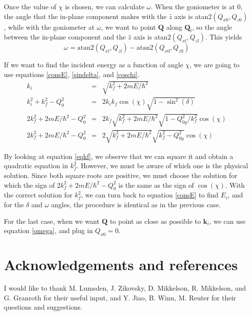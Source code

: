 \documentclass[prb]{revtex4}%
\begin{document}
Once the value of $\chi$ is chosen, we can calculate $\omega$. When the goniometer
is at 0, the angle that the in-plane component makes with the $\widehat{z}$ axis is
atan2$(Q_{x0},Q_{z0})$, while with the goniometer at $\omega$, we want to point $\textbf{Q}$ along
$\textbf{Q}_l$, so the angle between the in-plane component and the $\widehat{z}$ axis is
atan2$(Q_{xl},Q_{zl})$. This yields
\begin{equation}\label{omega}
    \omega = \text{atan2}(Q_{xl},Q_{zl}) - \text{atan2}(Q_{x0},Q_{z0})
\end{equation}

If we want to find the incident energy as a function of angle $\chi$, we are going to use
equations \ref{consE}, \ref{sindelta}, and \ref{coschi}.
\begin{eqnarray}
  k_i &=& \sqrt{k_f^2 + 2 m E/\hbar^2} \\
  k_i^2 + k_f^2 - Q_0^2 &=& 2 k_i k_f \cos(\chi) \sqrt{1-\sin^2(\delta)} \\
  2 k_f^2 + 2 m E/\hbar^2 - Q_0^2 &=& 2 k_f \sqrt{k_f^2 + 2 m E/\hbar^2} \sqrt{1-Q_{0y}^2/k_f^2} \cos(\chi) \\
  2 k_f^2 + 2 m E/\hbar^2 - Q_0^2 &=& 2 \sqrt{k_f^2 + 2 m E/\hbar^2} \sqrt{k_f^2-Q_{0y}^2} \cos(\chi) \label{eqkf}
\end{eqnarray}

By looking at equation \ref{eqkf}, we observe that we can square it and obtain a quadratic
equation in $k_f^2$. However, we must be aware of which one is the physical solution. Since both
square roots are positive, we must choose the solution for which the sign of $2 k_f^2 + 2 m E/\hbar^2 - Q_0^2$ is the same as the sign of $\cos(\chi)$. With the correct solution for $k_f^2$, we can turn back to
equation \ref{consE} to find $E_i$, and for the $\delta$ and $\omega$ angles, the procedure is identical as in the previous case.

For the last case, when we want $\textbf{Q}$ to point as close as possible to $\textbf{k}_i$, we can use
equation \ref{omega}, and plug in $Q_{x0}=0$.

\section{Acknowledgements and references}
I would like to thank M. Lumsden, J. Zikovsky, D. Mikkelson, R. Mikkelson, and G. Granroth for their useful input,
and Y. Jiao, B. Winn, M. Reuter for their questions and suggestions.
\end{document}
